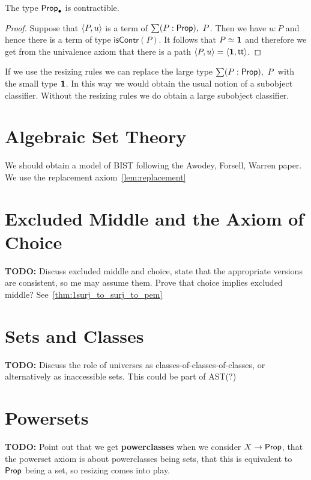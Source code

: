 \begin{lem}\label{lem:subobject}
The type $\mathsf{Prop}_\bullet$ is contractible.
\end{lem}
\begin{proof}
Suppose that ${\langle P,u\rangle}$ is a term of $\sum(P:\mathsf{Prop}),\ P$. Then we have $u:P$ and hence there is a term of type $\mathsf{isContr}(P)$. It
follows that $P\simeq\mathbf{1}$ and therefore we get from the univalence axiom that there is a path
${\langle P,u\rangle}={\langle \mathbf{1},\mathsf{tt}\rangle}$.
\end{proof}

If we use the resizing rules we can replace the large type $\sum(P:\mathsf{Prop}),\ P$ with the small type $\mathbf{1}$. In this way we would obtain
the usual notion of a subobject classifier. Without the resizing rules we do obtain a large subobject classifier.

\section{Algebraic Set Theory}
We should obtain a model of BIST following the Awodey, Forsell, Warren paper. 
We use the replacement axiom~\ref{lem:replacement}

\section{Excluded Middle and the Axiom of Choice}
\label{sec:excl-middle-axiom}

\textbf{TODO:} Discuss excluded middle and choice, state that the appropriate versions are
consistent, so me may assume them. Prove that choice implies excluded middle?
See~\ref{thm:1surj_to_surj_to_pem}

\section{Sets and Classes}
\label{sec:sets-classes}

\textbf{TODO:} Discuss the role of universes as classes-of-classes-of-classes, or
alternatively as inaccessible sets.
This could be part of AST(?)

\section{Powersets}
\label{sec:powersets}

\textbf{TODO:} Point out that we get \textbf{powerclasses} when we consider $X \to \mathsf{Prop}$, that the
powerset axiom is about powerclasses being sets, that this is equivalent to $\mathsf{Prop}$ being
a set, so resizing comes into play.

